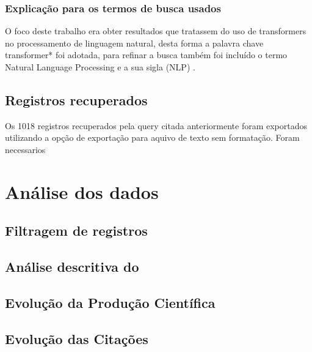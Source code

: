 \subsubsection{Explicação para os termos de busca usados}
O foco deste trabalho era obter resultados que tratassem do uso de transformers no processamento de linguagem natural, desta forma a palavra chave transformer* foi adotada, para refinar a busca também foi incluído o termo Natural Language Processing e a sua sigla (NLP) .

\subsection{Registros recuperados}
Os 1018 registros recuperados pela query citada anteriormente foram exportados utilizando a opção de exportação para aquivo de texto sem formatação. Foram necessarios 

\section{Análise dos dados}

\subsection{Filtragem de registros}

\subsection{Análise descritiva do \dataset\   }

\subsection{Evolução da Produção Científica}

\subsection{Evolução das Citações}

